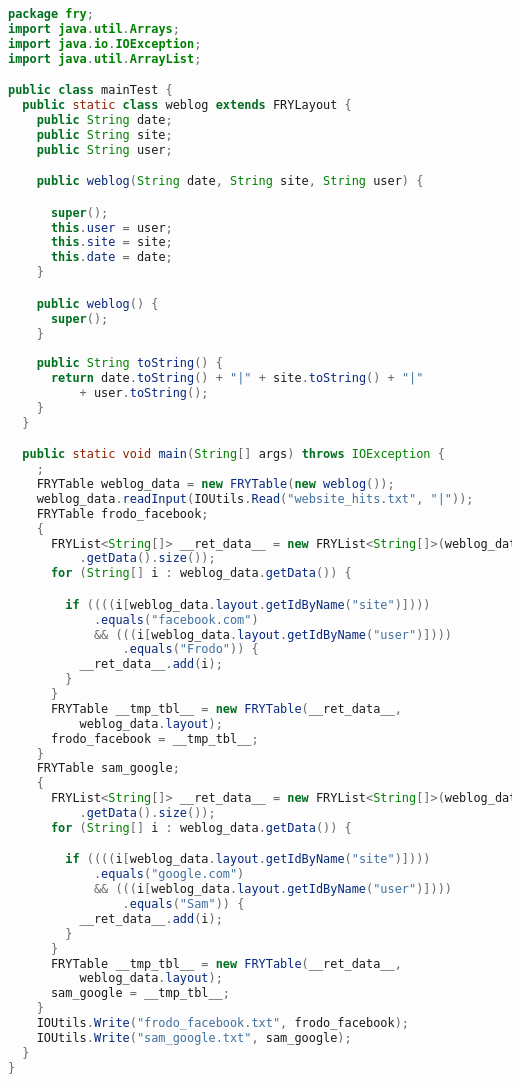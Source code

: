 \documentclass{article}
\begin{document}
\begin{lstlisting}[language=Java,
basicstyle=\ttm,
commentstyle=\color{comment}\ttm,
otherkeywords={},             % Add keywords here
keywordstyle=\ttb\color{deepblue},
stringstyle=\color{deepgreen},
frame=tb,                         % Any extra options here
showstringspaces=false,            
breaklines=true]
package fry;
import java.util.Arrays;
import java.io.IOException;
import java.util.ArrayList;

public class mainTest {
  public static class weblog extends FRYLayout {
    public String date;
    public String site;
    public String user;

    public weblog(String date, String site, String user) {

      super();
      this.user = user;
      this.site = site;
      this.date = date;
    }

    public weblog() {
      super();
    }
    
    public String toString() {
      return date.toString() + "|" + site.toString() + "|"
          + user.toString();
    }
  }

  public static void main(String[] args) throws IOException {
    ;
    FRYTable weblog_data = new FRYTable(new weblog());
    weblog_data.readInput(IOUtils.Read("website_hits.txt", "|"));
    FRYTable frodo_facebook;
    {
      FRYList<String[]> __ret_data__ = new FRYList<String[]>(weblog_data
          .getData().size());
      for (String[] i : weblog_data.getData()) {

        if ((((i[weblog_data.layout.getIdByName("site")])))
            .equals("facebook.com")
            && (((i[weblog_data.layout.getIdByName("user")])))
                .equals("Frodo")) {
          __ret_data__.add(i);
        }
      }
      FRYTable __tmp_tbl__ = new FRYTable(__ret_data__,
          weblog_data.layout);
      frodo_facebook = __tmp_tbl__;
    }
    FRYTable sam_google;
    {
      FRYList<String[]> __ret_data__ = new FRYList<String[]>(weblog_data
          .getData().size());
      for (String[] i : weblog_data.getData()) {

        if ((((i[weblog_data.layout.getIdByName("site")])))
            .equals("google.com")
            && (((i[weblog_data.layout.getIdByName("user")])))
                .equals("Sam")) {
          __ret_data__.add(i);
        }
      }
      FRYTable __tmp_tbl__ = new FRYTable(__ret_data__,
          weblog_data.layout);
      sam_google = __tmp_tbl__;
    }
    IOUtils.Write("frodo_facebook.txt", frodo_facebook);
    IOUtils.Write("sam_google.txt", sam_google);
  }
}
\end{lstlisting}
\end{document}
